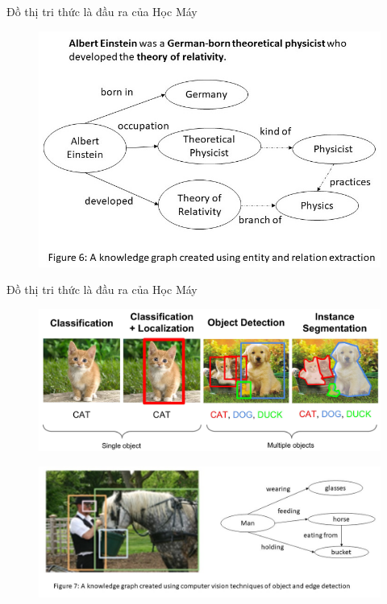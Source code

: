 \documentclass[notheorems, aspectratio=54]{beamer}
\begin{document}
	\begin{frame}{Đồ thị tri thức là đầu ra của Học Máy}
		\begin{figure}[H]
			\includegraphics[width=1\linewidth]{figs/image2.jpg}
			\label{fig:writing-thesis}
		\end{figure}
	\end{frame}
	\begin{frame}{Đồ thị tri thức là đầu ra của Học Máy}
		\begin{figure}[H]
			\includegraphics[width=0.5\linewidth]{figs/img.jpg}
			\label{fig:writing-thesis}
		\end{figure}
		\begin{figure}[H]
			\includegraphics[width=1\linewidth]{figs/image6.jpg}
			\label{fig:writing-thesis}
		\end{figure}
	\end{frame}
\end{document}
